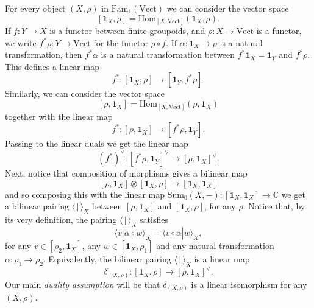 \documentclass[12pt]{scrartcl}
\theoremstyle{definition}
\numberwithin{equation}{section}
\numberwithin{definition}{section}
\numberwithin{figure}{section}
\begin{document}
For every object $(X,\rho)$ in $\mathrm{Fam}_1(\mathrm{Vect})$ we can consider the vector space 
\[
[\mathbf{1}_X,\rho]=\mathrm{Hom}_{[X,\mathrm{Vect}]}(\mathbf{1}_X,\rho).
\]
If $f\colon Y\to X$ is a functor between finite groupoids, and $\rho\colon X\to \mathrm{Vect}$ is a functor, we write $f^*\rho\colon Y\to \mathrm{Vect}$ for the functor $\rho\circ f$. If $\alpha\colon \mathbf{1}_X\to \rho$ is a natural transformation, then $f^*\alpha$ is a natural transformation between $f^*\mathbf{1}_X=\mathbf{1}_Y$ and $f^*\rho$. This defines a linear map
\[
f^* \colon [\mathbf{1}_X,\rho] \to [\mathbf{1}_Y, f^*\rho].
\]
Similarly, we can consider the vector space
\[
[\rho,\mathbf{1}_X]=\mathrm{Hom}_{[X,\mathrm{Vect}]}(\rho, \mathbf{1}_X)
\]
together with the linear map 
\[
f^* \colon [\rho,\mathbf{1}_X] \to [f^*\rho,\mathbf{1}_Y].
\]
Passing to the linear duals we get the linear map
\[
(f^*)^\vee\colon [f^*\rho,\mathbf{1}_Y]^\vee \to [\rho,\mathbf{1}_X]^\vee.
\]
Next, notice that composition of morphisms gives a bilinear map
\[
[\rho,\mathbf{1}_X]\otimes [\mathbf{1}_X,\rho] \to [\mathbf{1}_X,\mathbf{1}_X]
\]
and so composing this with the linear map $\mathrm{Sum}_0(X,-)\colon [\mathbf{1}_X,\mathbf{1}_X]\to \mathbb{C}$ we get a bilinear pairing $\langle\,|\,\rangle_X$ between $[\rho,\mathbf{1}_X]$ and $[\mathbf{1}_X,\rho]$, for any $\rho$. Notice that, by its very definition, the pairing $\langle\,|\,\rangle_X$ satisfies
\[
\langle v|\alpha\circ w\rangle_X =\langle  v\circ \alpha|w \rangle_X,
\]
for any $v\in [\rho_2,\mathbf{1}_X]$, any $w\in [\mathbf{1}_X,\rho_1]$ and any natural transformation $\alpha\colon \rho_1\to \rho_2$.
Equivalently, the bilinear pairing $\langle\,|\,\rangle_X$ is a linear map
\[
\delta_{(X,\rho)}\colon [\mathbf{1}_X,\rho]\to [\rho,\mathbf{1}_X]^\vee.
\]
Our main \emph{duality assumption} will be that $\delta_{(X,\rho)}$ is a linear isomorphism for any $(X,\rho)$. 
\end{document}
